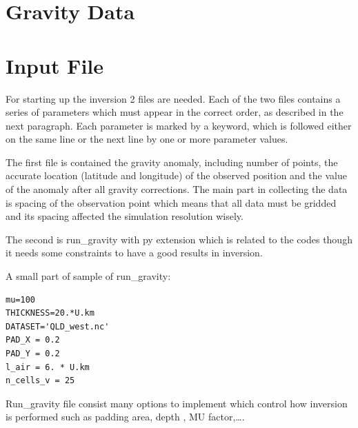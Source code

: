 \section{Gravity Data}





\section{Input File} 

For starting up the inversion 2 files are needed. Each of the 
two files contains a series of parameters which must appear in the correct order, as described in 
the next paragraph. Each parameter is marked by a keyword, which is followed either on the same line 
or the next line by one or more parameter values. 

The first file is contained the gravity anomaly, including number of points, the accurate location
(latitude and longitude) of the observed position and the value of the anomaly after all gravity corrections. 
The main part in collecting the data is spacing of the observation point which means that all data must be gridded and 
its spacing affected the simulation resolution wisely.

The second is run_gravity with py extension which is related to the codes though 
it needs some constraints to have a good results in inversion.

A small part of sample of run_gravity:

\begin{verbatim}
mu=100
THICKNESS=20.*U.km
DATASET='QLD_west.nc'
PAD_X = 0.2
PAD_Y = 0.2
l_air = 6. * U.km
n_cells_v = 25
\end{verbatim}

Run_gravity file consist many options to implement which control how inversion is performed such as padding area, depth , MU factor,\ldots.

